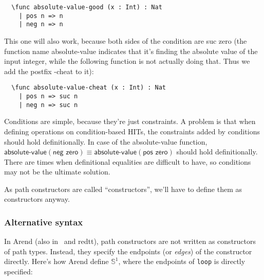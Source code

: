 \begin{verbatim}
  \func absolute-value-good (x : Int) : Nat
    | pos n => n
    | neg n => n
\end{verbatim}

This one will also work, because both sides of the condition
are \textsf{suc zero}
(the function name \textsf{absolute-value} indicates that it's finding
the absolute value of the input integer, while the following function
is not actually doing that.
Thus we add the postfix \textsf{-cheat} to it):

\begin{verbatim}
  \func absolute-value-cheat (x : Int) : Nat
    | pos n => suc n
    | neg n => suc n
\end{verbatim}


Conditions are simple, because they're just constraints.
A problem is that when defining operations on condition-based HITs,
the constraints added by conditions should hold definitionally.
In case of the \textsf{absolute-value} function,
$\textsf{absolute-value}(\textsf{neg zero}) \equiv
\textsf{absolute-value}(\textsf{pos zero})$ should hold definitionally.
There are times when definitional equalities are difficult to have,
so conditions may not be the ultimate solution.

As path constructors are called ``constructors'',
we'll have to define them as constructors anyway.




\subsubsection{Alternative syntax}

In Arend (also in \RedPRL\ and redtt),
path constructors are not written as constructors of path types.
Instead, they specify the endpoints (or \textit{edges})
of the constructor directly.
Here's how Arend define $\mathbb{S}^1$,
where the endpoints of \texttt{loop} is directly specified:

